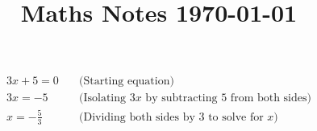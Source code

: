 \documentclass{article}
\title{Maths Notes \today}
\begin{document}
\maketitle
\begin{align}
	3x + 5 = 0 \quad &\text{(Starting equation)} \\ 
	3x = -5 \quad &\text{(Isolating } 3x \text{ by subtracting } 5 \text{ from both sides)} \\ 
	x = -\frac{5}{3} \quad &\text{(Dividing both sides by } 3 \text{ to solve for } x\text{)}
\end{align}
\end{document}
